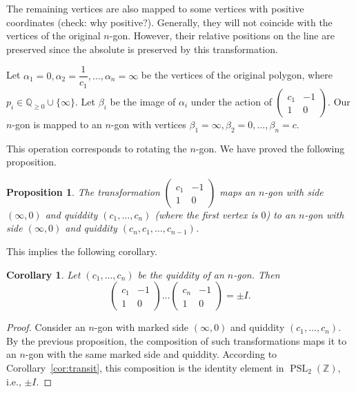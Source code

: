 \documentclass[a4paper,11pt]{amsart}
\newcommand{\QQ}{{\mathbb{Q}}}
\newcommand{\ZZ}{{\mathbb{Z}}}
\newcommand{\PSL}{\mathop{\mathrm{PSL}}}
\theoremstyle{plain}
\newtheorem{prop}[theorem]{Proposition}
\newtheorem{corollary}[theorem]{Corollary}
\theoremstyle{remark}
\theoremstyle{definition}
\numberwithin{equation}{section}
\numberwithin{figure}{section}
\begin{document}
The remaining vertices are also mapped to some vertices with positive coordinates (check: why positive?). Generally, they will not coincide with the vertices of the original $n$-gon. However, their relative positions on the line are preserved since the absolute is preserved by this transformation.

Let $\alpha_1=0,\alpha_2=\dfrac 1{c_1}, \dots,\alpha_n=\infty$ be the vertices of the original polygon, where $p_i\in\QQ_{\geq 0}\cup\{\infty\}$. Let $\beta_i$ be the image of $\alpha_i$ under the action of $\begin{pmatrix} c_1 & -1\\1 &0\end{pmatrix}$. Our $n$-gon is mapped to an $n$-gon with vertices $\beta_1=\infty, \beta_2=0,\dots,\beta_{n}=c$.

This operation corresponds to rotating the $n$-gon. We have proved the following proposition.

\begin{prop}\label{prop:turn} The transformation $\begin{pmatrix} c_1 & -1\\1 &0\end{pmatrix}$ maps an $n$-gon with side $(\infty,0)$ and quiddity $(c_1,\dots,c_n)$ (where the first vertex is $0$) to an $n$-gon with side $(\infty,0)$ and quiddity $(c_n,c_1,\dots,c_{n-1})$.
\end{prop}

This implies the following corollary.
\begin{corollary}
Let $(c_1,\dots,c_n)$ be the quiddity of an $n$-gon. Then
\[
\begin{pmatrix} c_1 & -1\\1 &0\end{pmatrix}\dots \begin{pmatrix} c_n & -1\\1 &0\end{pmatrix}=\pm I.
\]
\end{corollary}

\begin{proof}
Consider an $n$-gon with marked side $(\infty,0)$ and quiddity $(c_1,\dots,c_n)$. By the previous proposition, the composition of such transformations maps it to an $n$-gon with the same marked side and quiddity. According to Corollary~\ref{cor:transit}, this composition is the identity element in $\PSL_2(\ZZ)$, i.e., $\pm I$.
\end{proof}
\end{document}
